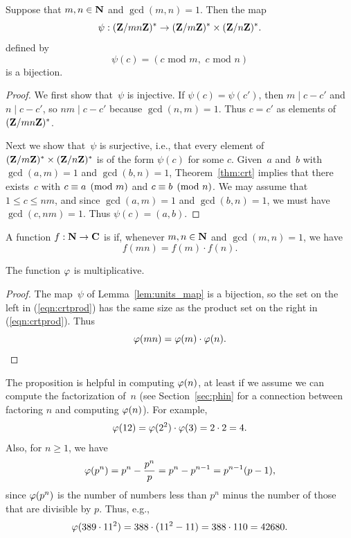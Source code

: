 \begin{lemma}\label{lem:units_map}
Suppose that $m,n\in\mathbf{N}$ and $\gcd(m,n)=1$.
Then the map
\begin{equation}\label{eqn:crtprod}
\psi: (\mathbf{Z}/mn\mathbf{Z}{})^* \rightarrow (\mathbf{Z}/m\mathbf{Z}{})^* \times (\mathbf{Z}/n\mathbf{Z}{})^*.
\end{equation}
defined by
$$
 \psi(c) = (c\text{ mod } m, \,\,c \text{ mod }n)
$$
is a bijection.
\end{lemma}
\begin{proof}
We first show that~$\psi$ is injective.  If $\psi(c)=\psi(c')$, then
$m\mid c-c'$ and $n\mid c-c'$, so $nm\mid c-c'$ because $\gcd(n,m)=1$.
Thus $c=c'$ as elements of $(\mathbf{Z}/mn\mathbf{Z}{})^*$.

Next we show that~$\psi$ is surjective, i.e., that
every element of $(\mathbf{Z}/m\mathbf{Z}{})^* \times (\mathbf{Z}/n\mathbf{Z}{})^*$ is of the
form $\psi(c)$ for some $c$. Given~$a$ and~$b$  with $\gcd(a,m)=1$ and
$\gcd(b,n)=1$, Theorem~\ref{thm:crt} implies that there
exists~$c$ with $c\equiv a\pmod{m}$ and $c\equiv b\pmod{n}$.  We
may assume that $1\leq c\leq nm$, and since $\gcd(a,m)=1$ and
$\gcd(b,n)=1$, we must have $\gcd(c,nm)=1$. Thus $\psi(c)=(a,b)$.
\end{proof}

\begin{definition}
A function $f:\mathbf{N}\rightarrow \mathbf{C}$ is
 if, whenever $m, n\in\mathbf{N}$ and $\gcd(m,n)=1$, we have
$$
   f(mn) = f(m)\cdot f(n).
$$
\end{definition}

\begin{proposition}\label{prop:phimult}
The function $\varphi$ is multiplicative.
\end{proposition}
\begin{proof}
  The map~$\psi$ of Lemma~\ref{lem:units_map} is a bijection, so the
  set on the left in (\ref{eqn:crtprod}) has the same size as the
  product set on the right in (\ref{eqn:crtprod}).  Thus
  $$
  \varphi(mn) = \varphi(m)\cdot \varphi(n).
  $$
\end{proof}


The proposition is helpful in computing $\varphi(n)$, at least
if we assume we can compute the factorization of~$n$ (see
Section~\ref{sec:phin} for a connection between factoring $n$
and computing $\varphi(n)$).
For example,
$$
   \varphi(12) = \varphi(2^2)\cdot \varphi(3) = 2\cdot 2 = 4.
$$
Also, for $n\geq 1$, we have
\begin{equation}\label{eqn:phipower}
   \varphi(p^n) = p^n - \frac{p^n}{p} = p^n - p^{n-1} = p^{n-1}(p-1),
 \end{equation}
 since $\varphi(p^n)$ is the number of numbers less than $p^n$
minus the number of those that are divisible by $p$.
Thus, e.g.,
$$
   \varphi(389\cdot 11^2) = 388 \cdot (11^2 - 11) = 388\cdot 110 = 42680.
$$

